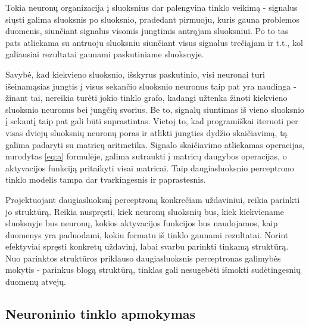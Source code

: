 \documentclass{VUMIFPSbakalaurinis}
\begin{document}
Tokia neuronų organizacija į sluoksnius dar palengvina tinklo veikimą - signalus siųsti galima sluoksnis po sluoksnio, pradedant pirmuoju, kuris gauna problemos duomenis, siunčiant signalus visomis jungtimis antrąjam sluoksniui.
Po to tas pats atliekama su antruoju sluoksniu siunčiant visus signalus trečiąjam ir t.t., kol galiausiai rezultatai gaunami paskutiniame sluoksnyje.

Savybė, kad kiekvieno sluoksnio, išskyrus paskutinio, visi neuronai turi išeinamąsias jungtis į visus sekančio sluoksnio neuronus taip pat yra naudinga - žinant tai, nereikia turėti jokio tinklo grafo, kadangi užtenka žinoti kiekvieno sluoksnio neuronus bei jungčių svorius.
Be to, signalų siuntimas iš vieno sluoksnio į sekantį taip pat gali būti suprastintas.
Vietoj to, kad programiškai iteruoti per visas dviejų sluoksnių neuronų poras ir atlikti jungties dydžio skaičiavimą, tą galima padaryti su matricų aritmetika.
Signalo skaičiavimo atliekamas operacijas, nurodytas \ref{eq:a} formulėje, galima sutraukti į matricų daugybos operacijas, o aktyvacijos funkciją pritaikyti visai matricai.
Taip daugiasluoksnio perceptrono tinklo modelis tampa dar tvarkingesnis ir paprastesnis.

Projektuojant daugiasluoksnį perceptroną konkrečiam uždaviniui, reikia parinkti jo struktūrą.
Reikia nuspręsti, kiek neuronų sluoksnių bus, kiek kiekviename sluoksnyje bus neuronų, kokios aktyvacijos funkcijos bus naudojamos, kaip duomenys yra paduodami, kokiu formatu iš tinklo gaunami rezultatai.
Norint efektyviai spręsti konkretų uždavinį, labai svarbu parinkti tinkamą struktūrą.
Nuo parinktos struktūros priklauso daugiasluoksnis perceptronas galimybės mokytis - parinkus blogą struktūrą, tinklas gali nesugebėti išmokti sudėtingesnių duomenų atvejų.



\subsection{Neuroninio tinklo apmokymas} \label{network-learning}

\end{document}
